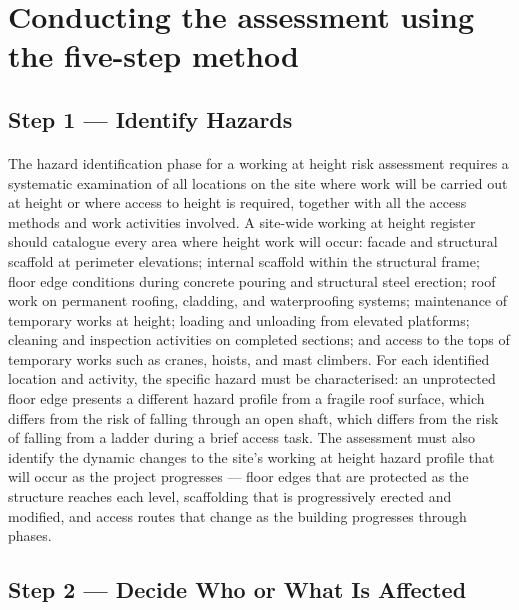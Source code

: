\section{Conducting the assessment using the five-step method}

\subsection{Step 1 --- Identify Hazards}

\paragraph{}
The hazard identification phase for a working at height risk assessment requires a systematic examination of all locations on the site where work will be carried out at height or where access to height is required, together with all the access methods and work activities involved. A site-wide working at height register should catalogue every area where height work will occur: facade and structural scaffold at perimeter elevations; internal scaffold within the structural frame; floor edge conditions during concrete pouring and structural steel erection; roof work on permanent roofing, cladding, and waterproofing systems; maintenance of temporary works at height; loading and unloading from elevated platforms; cleaning and inspection activities on completed sections; and access to the tops of temporary works such as cranes, hoists, and mast climbers. For each identified location and activity, the specific hazard must be characterised: an unprotected floor edge presents a different hazard profile from a fragile roof surface, which differs from the risk of falling through an open shaft, which differs from the risk of falling from a ladder during a brief access task. The assessment must also identify the dynamic changes to the site's working at height hazard profile that will occur as the project progresses --- floor edges that are protected as the structure reaches each level, scaffolding that is progressively erected and modified, and access routes that change as the building progresses through phases.

\subsection{Step 2 --- Decide Who or What Is Affected}

